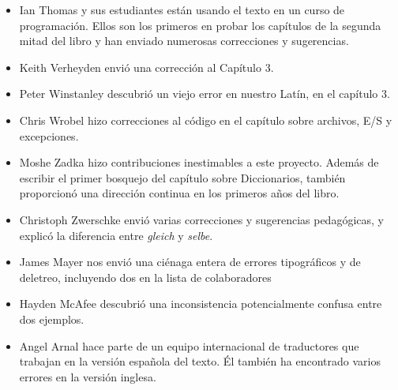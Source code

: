 \begin{itemize}
	\item Ian Thomas y sus estudiantes están usando el texto en un curso
	de programación. Ellos son los primeros en probar los capítulos de la
	segunda mitad del libro y han enviado numerosas correcciones y 
	sugerencias.
	\item Keith Verheyden envió una corrección al Capítulo 3.
	\item Peter Winstanley descubrió un viejo error en nuestro Latín,
	en el capítulo 3.
	\item Chris Wrobel hizo correcciones al código en el capítulo sobre 
	archivos, E/S y excepciones. 
	\item Moshe Zadka hizo contribuciones inestimables a este proyecto.  Además
	de escribir el primer bosquejo del capítulo sobre Diccionarios, también 
	proporcionó una dirección continua en los primeros años del libro.
	\item Christoph Zwerschke envió varias correcciones y sugerencias 
	pedagógicas, y explicó la diferencia entre {\em gleich} y {\em selbe}.
	\item James Mayer nos envió una ciénaga entera de  errores tipográficos 
	y de deletreo, incluyendo dos en la lista de colaboradores
	\item Hayden McAfee descubrió una inconsistencia potencialmente confusa 
	entre dos ejemplos.
	\item Angel Arnal hace parte de un equipo internacional de traductores que
	trabajan en la versión española del texto. Él también ha encontrado varios 
	errores en la versión inglesa.
\end{itemize}
